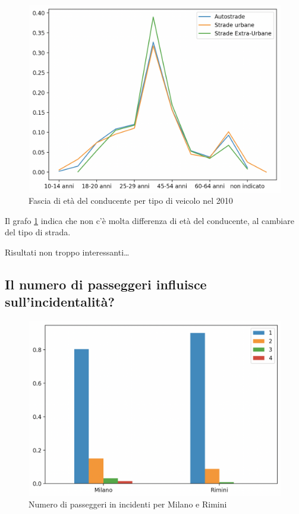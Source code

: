 \documentclass[a4paper]{report}
\begin{document}
\begin{figure}
    \includegraphics[width=\linewidth]{../src/incidenti/incidenti_senza_coords/tipo_veicoli/differenza_eta.png}
    \caption{Fascia di età del conducente per tipo di veicolo nel 2010}
    \label{fig:differenza-eta}
\end{figure}

Il grafo \ref{fig:differenza-eta} indica che non c'è molta differenza di età del conducente, 
al cambiare del tipo di strada.


Risultati non troppo interessanti\dots


\subsection{Il numero di passeggeri influisce sull'incidentalità?}

\begin{figure}
    \includegraphics[width=\linewidth]{../src/incidenti/incidenti_senza_coords/tipo_veicoli/passeggeri.png}
    \caption{Numero di passeggeri in incidenti per Milano e Rimini}
    \label{fig:passeggeri-milano-rimini}
\end{figure}
\end{document}
